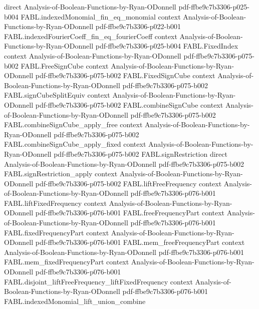\begin{theorem}
  {direct}
  {Analysis-of-Boolean-Functions-by-Ryan-ODonnell}
  {pdf-ffbe9c7b3306-p025-b004}
\proofstep
  {FABL.indexedMonomial_fin_eq_monomial}
  {context}
  {Analysis-of-Boolean-Functions-by-Ryan-ODonnell}
  {pdf-ffbe9c7b3306-p022-b001}
\proofstep
  {FABL.indexedFourierCoeff_fin_eq_fourierCoeff}
  {context}
  {Analysis-of-Boolean-Functions-by-Ryan-ODonnell}
  {pdf-ffbe9c7b3306-p025-b004}
\proofstep
  {FABL.FixedIndex}
  {context}
  {Analysis-of-Boolean-Functions-by-Ryan-ODonnell}
  {pdf-ffbe9c7b3306-p075-b002}
\proofstep
  {FABL.FreeSignCube}
  {context}
  {Analysis-of-Boolean-Functions-by-Ryan-ODonnell}
  {pdf-ffbe9c7b3306-p075-b002}
\proofstep
  {FABL.FixedSignCube}
  {context}
  {Analysis-of-Boolean-Functions-by-Ryan-ODonnell}
  {pdf-ffbe9c7b3306-p075-b002}
\proofstep
  {FABL.signCubeSplitEquiv}
  {context}
  {Analysis-of-Boolean-Functions-by-Ryan-ODonnell}
  {pdf-ffbe9c7b3306-p075-b002}
\proofstep
  {FABL.combineSignCube}
  {context}
  {Analysis-of-Boolean-Functions-by-Ryan-ODonnell}
  {pdf-ffbe9c7b3306-p075-b002}
\proofstep
  {FABL.combineSignCube_apply_free}
  {context}
  {Analysis-of-Boolean-Functions-by-Ryan-ODonnell}
  {pdf-ffbe9c7b3306-p075-b002}
\proofstep
  {FABL.combineSignCube_apply_fixed}
  {context}
  {Analysis-of-Boolean-Functions-by-Ryan-ODonnell}
  {pdf-ffbe9c7b3306-p075-b002}
\proofstep
  {FABL.signRestriction}
  {direct}
  {Analysis-of-Boolean-Functions-by-Ryan-ODonnell}
  {pdf-ffbe9c7b3306-p075-b002}
\proofstep
  {FABL.signRestriction_apply}
  {context}
  {Analysis-of-Boolean-Functions-by-Ryan-ODonnell}
  {pdf-ffbe9c7b3306-p075-b002}
\proofstep
  {FABL.liftFreeFrequency}
  {context}
  {Analysis-of-Boolean-Functions-by-Ryan-ODonnell}
  {pdf-ffbe9c7b3306-p076-b001}
\proofstep
  {FABL.liftFixedFrequency}
  {context}
  {Analysis-of-Boolean-Functions-by-Ryan-ODonnell}
  {pdf-ffbe9c7b3306-p076-b001}
\proofstep
  {FABL.freeFrequencyPart}
  {context}
  {Analysis-of-Boolean-Functions-by-Ryan-ODonnell}
  {pdf-ffbe9c7b3306-p076-b001}
\proofstep
  {FABL.fixedFrequencyPart}
  {context}
  {Analysis-of-Boolean-Functions-by-Ryan-ODonnell}
  {pdf-ffbe9c7b3306-p076-b001}
\proofstep
  {FABL.mem_freeFrequencyPart}
  {context}
  {Analysis-of-Boolean-Functions-by-Ryan-ODonnell}
  {pdf-ffbe9c7b3306-p076-b001}
\proofstep
  {FABL.mem_fixedFrequencyPart}
  {context}
  {Analysis-of-Boolean-Functions-by-Ryan-ODonnell}
  {pdf-ffbe9c7b3306-p076-b001}
\proofstep
  {FABL.disjoint_liftFreeFrequency_liftFixedFrequency}
  {context}
  {Analysis-of-Boolean-Functions-by-Ryan-ODonnell}
  {pdf-ffbe9c7b3306-p076-b001}
\proofstep
  {FABL.indexedMonomial_lift_union_combine}

\end{theorem}
